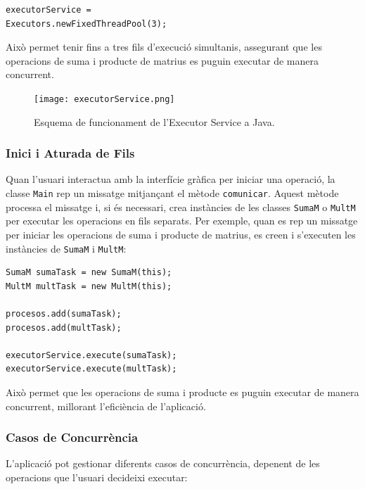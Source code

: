 \documentclass{ieeetj}
\begin{document}
\begin{verbatim}
executorService = 
Executors.newFixedThreadPool(3);
\end{verbatim}

Això permet tenir fins a tres fils d'execució simultanis, assegurant que les operacions de suma i producte de matrius es puguin executar de manera concurrent.

\begin{figure}[htbp]
\centerline{\texttt{[image: executorService.png]}}
\caption{Esquema de funcionament de l'Executor Service a Java.}
\label{fig:exeServ}
\end{figure}

\subsubsection{Inici i Aturada de Fils}
Quan l'usuari interactua amb la interfície gràfica per iniciar una operació, la classe \texttt{Main} rep un missatge mitjançant el mètode \texttt{comunicar}. Aquest mètode processa el missatge i, si és necessari, crea instàncies de les classes \texttt{SumaM} o \texttt{MultM} per executar les operacions en fils separats. Per exemple, quan es rep un missatge per iniciar les operacions de suma i producte de matrius, es creen i s'executen les instàncies de \texttt{SumaM} i \texttt{MultM}:

\begin{verbatim}
SumaM sumaTask = new SumaM(this);
MultM multTask = new MultM(this);

procesos.add(sumaTask);
procesos.add(multTask);

executorService.execute(sumaTask);
executorService.execute(multTask);
\end{verbatim}

Això permet que les operacions de suma i producte es puguin executar de manera concurrent, millorant l'eficiència de l'aplicació.

\subsubsection{Casos de Concurrència}
L'aplicació pot gestionar diferents casos de concurrència, depenent de les operacions que l'usuari decideixi executar:
\end{document}

